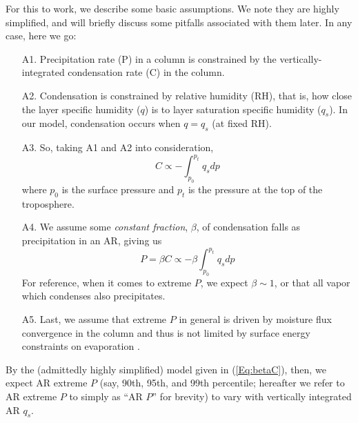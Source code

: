 \documentclass[letterpaper,12pt]{article}
\begin{document}
For this to work, we describe some basic assumptions. We note they are highly simplified, and will briefly discuss some pitfalls associated with them later. In any case, here we go:
\begin{enumerate}[noitemsep]\vspace{-\topsep}
    \item[A1.] Precipitation rate (P) in a column is constrained by the vertically-integrated condensation rate (C) in the column.
    \item[A2.] Condensation is constrained by relative humidity (RH), that is, how close the layer specific humidity ($q$) is to layer saturation specific humidity ($q_s$). In our model, condensation occurs when $q = q_s$ (at fixed RH). 
    \item[A3.] So, taking A1 and A2 into consideration,
    \begin{equation}
        C \propto - \int_{p_0}^{p_t}q_sdp
    \end{equation} 
    where $p_0$ is the surface pressure and $p_t$ is the pressure at the top of the troposphere. 
    \item[A4.] We assume some \textit{constant fraction}, $\beta$, of condensation falls as precipitation in an AR, giving us
    \begin{equation}\label{Eq:betaC}
        P = \beta C \propto - \beta \int_{p_0}^{p_t}q_sdp
    \end{equation}
    For reference, when it comes to extreme $P$, we expect $\beta \sim 1$, or that all vapor which condenses also precipitates. 
    \item[A5.] Last, we assume that extreme $P$ in general is driven by moisture flux convergence in the column \cite{Trenberth2003ThePrecipitation} and thus is not limited by surface energy constraints on evaporation \cite{Held2006RobustWarming}.
\end{enumerate}
By the (admittedly highly simplified) model given in (\ref{Eq:betaC}), then, we expect AR extreme $P$ (say, 90th, 95th, and 99th percentile; hereafter we refer to AR extreme $P$ to simply as ``AR $P$'' for brevity) to vary with vertically integrated AR $q_s$. 

\end{document}
